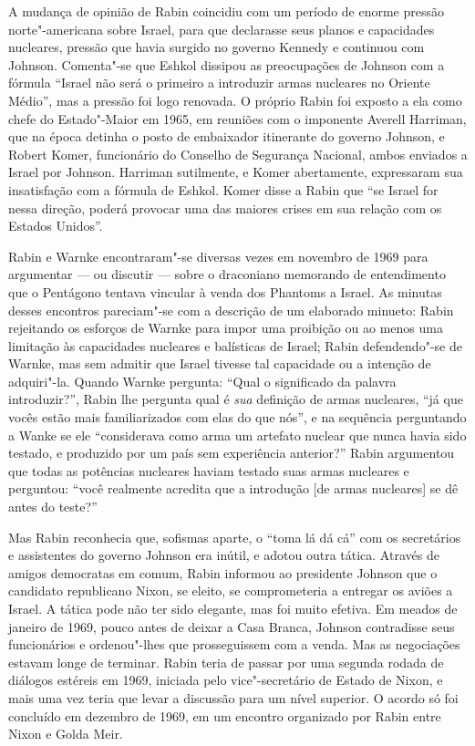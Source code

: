 A mudança de opinião de Rabin coincidiu com um período de enorme pressão
norte"-americana sobre Israel, para que declarasse seus planos e
capacidades nucleares, pressão que havia surgido no governo Kennedy e
continuou com Johnson. Comenta"-se que Eshkol dissipou as preocupações de
Johnson com a fórmula ``Israel não será o primeiro a introduzir armas
nucleares no Oriente Médio'', mas a pressão foi logo renovada. O próprio
Rabin foi exposto a ela como chefe do Estado"-Maior em 1965, em reuniões
com o imponente Averell Harriman, que na época detinha o posto de
embaixador itinerante do governo Johnson, e Robert Komer, funcionário do
Conselho de Segurança Nacional, ambos enviados a Israel por
Johnson. Harriman sutilmente, e Komer abertamente, expressaram sua
insatisfação com a fórmula de Eshkol. Komer disse a Rabin que ``se
Israel for nessa direção, poderá provocar uma das maiores crises em sua
relação com os Estados Unidos''.

Rabin e Warnke encontraram"-se diversas vezes em novembro de 1969 para
argumentar --- ou discutir --- sobre o draconiano memorando de
entendimento que o Pentágono tentava vincular à venda dos Phantoms a
Israel. As minutas desses encontros pareciam"-se com a descrição de um
elaborado minueto: Rabin rejeitando os esforços de Warnke para impor uma
proibição ou ao menos uma limitação às capacidades nucleares e
balísticas de Israel; Rabin defendendo"-se de Warnke, mas sem admitir que
Israel tivesse tal capacidade ou a intenção de adquiri"-la. Quando Warnke
pergunta: ``Qual o significado da palavra introduzir?'', Rabin lhe
pergunta qual é \emph{sua} definição de armas nucleares, ``já que
vocês estão mais familiarizados com elas do que nós'', e na sequência
perguntando a Wanke se ele ``considerava como arma um artefato nuclear
que nunca havia sido testado, e produzido por um país sem experiência
anterior?'' Rabin argumentou que todas as potências nucleares haviam
testado suas armas nucleares e perguntou: ``você realmente acredita que
a introdução {[}de armas nucleares{]} se dê antes do teste?''

Mas Rabin reconhecia que, sofismas aparte, o ``toma lá dá cá'' com os
secretários e assistentes do governo Johnson era inútil, e adotou outra
tática. Através de amigos democratas em comum, Rabin informou ao
presidente Johnson que o candidato republicano Nixon, se eleito, se
comprometeria a entregar os aviões a Israel. A tática pode não ter sido
elegante, mas foi muito efetiva. Em meados de janeiro de 1969, pouco
antes de deixar a Casa Branca, Johnson contradisse seus funcionários e
ordenou"-lhes que prosseguissem com a venda. Mas as negociações estavam
longe de terminar. Rabin teria de passar por uma segunda rodada de
diálogos estéreis em 1969, iniciada pelo vice"-secretário de Estado de
Nixon, e mais uma vez teria que levar a discussão para um nível
superior. O acordo só foi concluído em dezembro de 1969, em um encontro
organizado por Rabin entre Nixon e Golda Meir.

